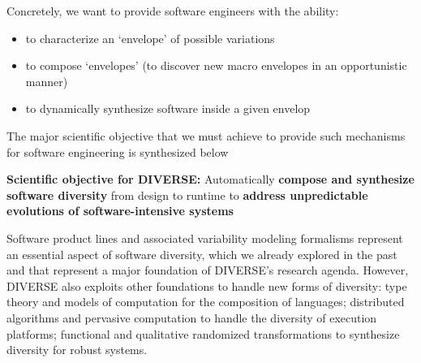 \documentclass{ra2018}
\newcommand{\team}{DIVERSE}
\begin{document}


%




  Concretely, we want to provide software engineers with the ability:
  \begin{itemize}
      \item to characterize an `envelope' of possible variations
      \item to compose `envelopes' (to discover new macro envelopes in an opportunistic manner)
      \item to dynamically synthesize software inside a given  envelop
  \end{itemize}

  The major scientific objective that we must achieve to provide such mechanisms for software engineering is synthesized below


    \textbf{Scientific objective for \team{}:} Automatically \textbf{compose and synthesize software diversity} from design to runtime to \textbf{address unpredictable evolutions of software-intensive systems} 

  Software product lines and associated variability modeling formalisms represent an essential aspect of software diversity, which we already explored in the past and that represent a major foundation of \team{}'s research agenda. 
  However, \team{}  also exploits other foundations to handle new forms of diversity: type theory and models of computation for the composition of languages; distributed algorithms and pervasive computation to handle the diversity of execution platforms;  functional and qualitative randomized transformations to synthesize diversity for robust systems.
\end{document}
